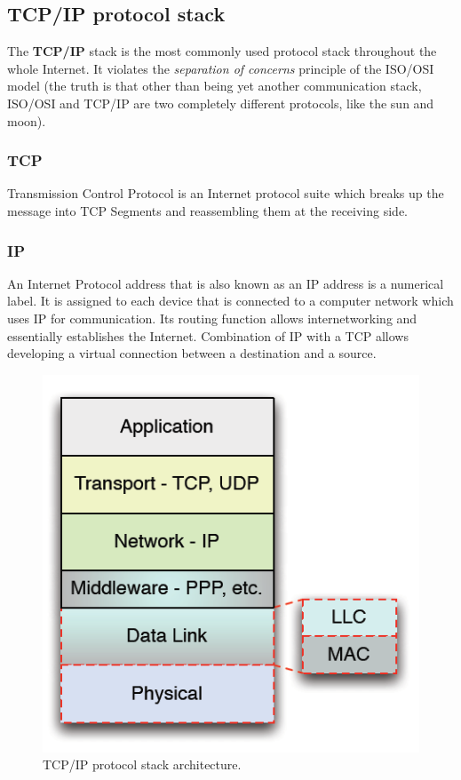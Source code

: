 
\subsection{TCP/IP protocol stack}
The  \textbf{TCP/IP} stack is  the most commonly used protocol stack throughout the whole Internet. It violates the \textit{separation of concerns} principle of the ISO/OSI model (the truth is that other than being yet another communication stack, ISO/OSI and TCP/IP are two completely different protocols, like the sun and moon).


\subsubsection*{TCP}
Transmission Control Protocol is an Internet protocol suite which breaks up the message into TCP Segments and reassembling them at the receiving side.


\subsubsection*{IP}
An Internet Protocol address that is also known as an IP address is a numerical label. It is assigned to each device that is connected to a computer network which uses IP for communication. Its routing function allows internetworking and essentially establishes the Internet. Combination of IP with a TCP allows developing a virtual connection between a destination and a source.

\begin{figure}[H]
    \centering
    \includegraphics[scale=0.5]{img/tcp.png}
    \decoRule
    \caption{TCP/IP protocol stack architecture.}
    \label{fig:tcp}
\end{figure}

